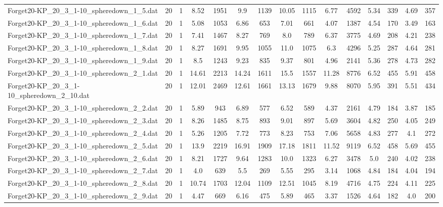\begin{table}[!ht]
{\begin{tabular}{lcccccccccccccc}
Forget20-KP\_20\_3\_1-10\_spheredown\_1\_5.dat & 20 & 1 & 8.52 & 1951 & 9.9 & 1139 & 10.05 & 1115 & 6.77 & 4592 & 5.34 & 339 & 4.69 & 357 \\
Forget20-KP\_20\_3\_1-10\_spheredown\_1\_6.dat & 20 & 1 & 5.08 & 1053 & 6.86 & 653 & 7.01 & 661 & 4.07 & 1387 & 4.54 & 170 & 3.49 & 163 \\
Forget20-KP\_20\_3\_1-10\_spheredown\_1\_7.dat & 20 & 1 & 7.41 & 1467 & 8.27 & 769 & 8.0 & 789 & 6.37 & 3775 & 4.69 & 208 & 4.21 & 238 \\
Forget20-KP\_20\_3\_1-10\_spheredown\_1\_8.dat & 20 & 1 & 8.27 & 1691 & 9.95 & 1055 & 11.0 & 1075 & 6.3 & 4296 & 5.25 & 287 & 4.64 & 281 \\
Forget20-KP\_20\_3\_1-10\_spheredown\_1\_9.dat & 20 & 1 & 8.5 & 1243 & 9.23 & 835 & 9.37 & 801 & 4.96 & 2141 & 5.36 & 278 & 4.73 & 282 \\
Forget20-KP\_20\_3\_1-10\_spheredown\_2\_1.dat & 20 & 1 & 14.61 & 2213 & 14.24 & 1611 & 15.5 & 1557 & 11.28 & 8776 & 6.52 & 455 & 5.91 & 458 \\
Forget20-KP\_20\_3\_1-10\_spheredown\_2\_10.dat & 20 & 1 & 12.01 & 2469 & 12.61 & 1661 & 13.13 & 1679 & 9.88 & 8070 & 5.95 & 391 & 5.51 & 434 \\
Forget20-KP\_20\_3\_1-10\_spheredown\_2\_2.dat & 20 & 1 & 5.89 & 943 & 6.89 & 577 & 6.52 & 589 & 4.37 & 2161 & 4.79 & 184 & 3.87 & 185 \\
Forget20-KP\_20\_3\_1-10\_spheredown\_2\_3.dat & 20 & 1 & 8.26 & 1485 & 8.75 & 893 & 9.01 & 897 & 5.69 & 3604 & 4.82 & 250 & 4.05 & 249 \\
Forget20-KP\_20\_3\_1-10\_spheredown\_2\_4.dat & 20 & 1 & 5.26 & 1205 & 7.72 & 773 & 8.23 & 753 & 7.06 & 5658 & 4.83 & 277 & 4.1 & 272 \\
Forget20-KP\_20\_3\_1-10\_spheredown\_2\_5.dat & 20 & 1 & 13.9 & 2219 & 16.91 & 1909 & 17.18 & 1811 & 11.52 & 9119 & 6.52 & 458 & 5.69 & 455 \\
Forget20-KP\_20\_3\_1-10\_spheredown\_2\_6.dat & 20 & 1 & 8.21 & 1727 & 9.64 & 1283 & 10.0 & 1323 & 6.27 & 3478 & 5.0 & 240 & 4.02 & 238 \\
Forget20-KP\_20\_3\_1-10\_spheredown\_2\_7.dat & 20 & 1 & 4.0 & 639 & 5.5 & 269 & 5.55 & 295 & 3.14 & 1068 & 4.84 & 184 & 4.04 & 194 \\
Forget20-KP\_20\_3\_1-10\_spheredown\_2\_8.dat & 20 & 1 & 10.74 & 1703 & 12.04 & 1109 & 12.51 & 1045 & 8.19 & 4716 & 4.75 & 224 & 4.11 & 225 \\
Forget20-KP\_20\_3\_1-10\_spheredown\_2\_9.dat & 20 & 1 & 4.47 & 669 & 6.16 & 475 & 5.89 & 465 & 3.37 & 1526 & 4.64 & 182 & 4.0 & 200 \\

\end{tabular}}
\end{table}
